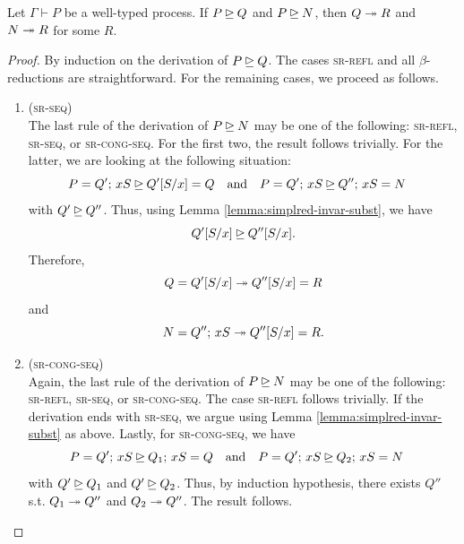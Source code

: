 \begin{lemma} \label{lemma:roncile-simplered}
  Let $\Gamma \vdash P$ be a well-typed process.
  If $P \unrhd Q$ and $P \unrhd N$, then $Q \twoheadrightarrow R$ and $N \twoheadrightarrow R$
  for some $R$.
\end{lemma}
\begin{proof}
  By induction on the derivation of $P \unrhd Q$.
  The cases \textsc{sr-refl} and all $\beta$-reductions are straightforward.
  For the remaining cases, we proceed as follows.

  \begin{enumerate}[itemsep=1em, label=Case:, leftmargin=*]
    \item (\textsc{sr-seq}) \\
      The last rule of the derivation of $P \unrhd N$ may be one of the following:
      \textsc{sr-refl}, \textsc{sr-seq}, or \textsc{sr-cong-seq}. For the first two,
      the result follows trivially. For the latter, we are looking at the following situation:
      \[
         P = Q' ;\, xS \unrhd Q'[S/x] = Q \quad \text{and} \quad
         P = Q' ;\, xS \unrhd Q'' ;\, xS = N \quad
      \]
      with $Q' \unrhd Q''$. Thus, using Lemma \ref{lemma:simplred-invar-subst},
      we have
      \[
        Q'[S/x] \unrhd Q''[S/x].
      \]
      Therefore,
      \[
        Q = Q'[S/x] \twoheadrightarrow Q''[S/x] = R
      \]
      and
      \[
        N = Q'' ;\, xS \twoheadrightarrow Q''[S/x] = R.
      \]

    \item (\textsc{sr-cong-seq}) \\
      Again, the last rule of the derivation of $P \unrhd N$ may be one of the following:
      \textsc{sr-refl}, \textsc{sr-seq}, or \textsc{sr-cong-seq}. The case \textsc{sr-refl} follows trivially.
      If the derivation ends with \textsc{sr-seq}, we argue using Lemma
      \ref{lemma:simplred-invar-subst} as above. Lastly, for \textsc{sr-cong-seq},
      we have
      \[
        P = Q' ;\, xS \unrhd Q_1 ;\, xS = Q \quad \text{and} \quad
        P = Q' ;\, xS \unrhd Q_2 ;\, xS = N \quad
      \]
      with $Q' \unrhd Q_1$ and $Q' \unrhd Q_2$. Thus, by induction hypothesis,
      there exists $Q''$ s.t. $Q_1 \twoheadrightarrow Q''$ and $Q_2 \twoheadrightarrow Q''$.
      The result follows.


\end{enumerate}
\end{proof}
